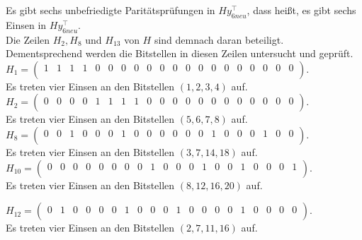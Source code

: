 \begin{Beispiel}
    Es gibt sechs unbefriedigte Paritätsprüfungen in $Hy_{6neu}^\intercal$,
    dass hei\ss{}t, es gibt sechs Einsen in $Hy_{6neu}^\intercal.$\\
    Die Zeilen $H_2, H_8$ und $H_{13}$ von $H$ sind demnach daran beteiligt.\\ 
    Dementsprechend werden die Bitstellen in diesen Zeilen untersucht und geprüft.\\
    
    $H_1= \left( \begin{array}{rrrrrrrrrrrrrrrrrrrr}
        1 & 1 & 1 & 1 & 0 & 0 & 0 & 0 & 0 & 0 & 0 & 0 & 0 & 0 & 0 & 0 & 0 & 0 & 0 & 0 \\
       \end{array}\right). 
    $\\
    Es treten vier Einsen an den Bitstellen $(1, 2, 3, 4)$ auf.\\
    
    $H_2= \left( \begin{array}{rrrrrrrrrrrrrrrrrrrr}
        0 & 0 & 0 & 0 & 1 & 1 & 1 & 1 & 0 & 0 & 0 & 0 & 0 & 0 & 0 & 0 & 0 & 0 & 0 & 0 \\
       \end{array}\right). 
    $\\
    Es treten vier Einsen an den Bitstellen $(5, 6, 7, 8)$ auf.\\
    
    $H_8=\left( \begin{array}{rrrrrrrrrrrrrrrrrrrr}
        0 & 0 & 1 & 0 & 0 & 0 & 1 & 0 & 0 & 0 & 0 & 0 & 0 & 1 & 0 & 0 & 0 & 1 & 0 & 0 \\
       \end{array}\right). 
    $\\
    Es treten vier Einsen an den Bitstellen $(3, 7, 14, 18)$ auf.\\
    
    $H_{10}=\left( \begin{array}{rrrrrrrrrrrrrrrrrrrr}
        0 & 0 & 0 & 0 & 0 & 0 & 0 & 0 & 1 & 0 & 0 & 0 & 1 & 0 & 0 & 1 & 0 & 0 & 0 & 1 \\
       \end{array}\right). 
    $\\
    Es treten vier Einsen an den Bitstellen $(8, 12, 16, 20)$ auf.\\
    \pagebreak
    
    $H_{12}= \left( \begin{array}{rrrrrrrrrrrrrrrrrrrr}
        0 & 1 & 0 & 0 & 0 & 0 & 1 & 0 & 0 & 0 & 1 & 0 & 0 & 0 & 0 & 1 & 0 & 0 & 0 & 0 \\
       \end{array}\right). 
    $\\
    Es treten vier Einsen an den Bitstellen $(2, 7, 11, 16)$ auf.\\
    

\end{Beispiel}
